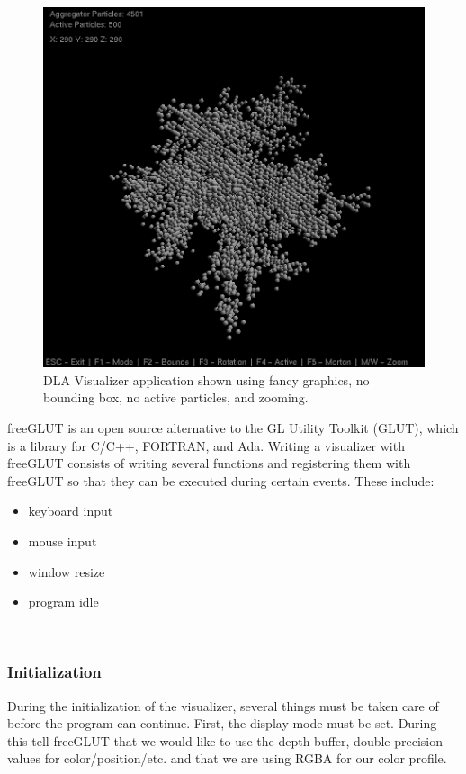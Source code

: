 \documentclass[fleqn,10pt]{UserGuideArx} %
\begin{document}
\begin{figure}[!ht]\centering %
    \includegraphics[width=\linewidth]{images/FancyNoBound.png}
    \caption{DLA Visualizer application shown using fancy graphics, no bounding box, no active particles, and zooming.}
    \label{fig:FancyNoBound}
    \end{figure}

freeGLUT is an open source alternative to the GL Utility Toolkit (GLUT), which is a library for C/C++, FORTRAN, and Ada. Writing a visualizer with freeGLUT consists of writing several functions and registering them with freeGLUT so that they can be executed during certain events. These include:
\begin{itemize}
    \item keyboard input
    \item mouse input
    \item window resize
    \item program idle
\end{itemize}
~\\
\subsubsection{Initialization}
    During the initialization of the visualizer, several things must be taken care of before the program can continue. First, the display mode must be set. During this tell freeGLUT that we would like to use the depth buffer, double precision values for color/position/etc. and that we are using RGBA for our color profile.\\
\end{document}
